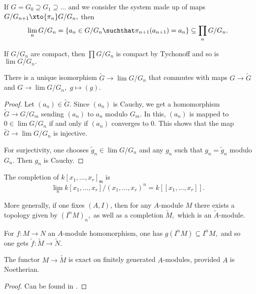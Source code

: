 \begin{prop}
  If \(G = G_0 \supseteq G_1 \supseteq \dotso\) and we consider the system made up of maps
  \(G/{G_{n+1}} \xto{\pi_n} G/{G_n},\) then
  \[\lim_n G/{G_n} = \{a_n \in G/{G_n} \suchthat \pi_{n+1}(a_{n+1}) = a_n\} \subseteq \prod_n G/{G_n}.\]
\end{prop}

\begin{note}
  If \(G/{G_n}\) are compact, then \(\prod G/{G_n}\) is compact by Tychonoff and so is \(\lim G/{G_n}.\)
\end{note}

\begin{prop}
  There is a unique isomorphism \(\tilde{G} \to \lim G/{G_n}\) that commutes with maps \(G \to \tilde{G}\) and \(G \to \lim G/{G_n},\) \(g \mapsto (g).\)
\end{prop}
\begin{proof}
  Let \((a_n) \in \tilde{G}.\) Since \((a_n)\) is Cauchy, we get a homomorphism
  \(\tilde{G} \to G/{G_m}\) sending \((a_n)\) to \(a_n\) modulo \(G_m.\)
  In this, \((a_n)\) is mapped to \(0 \in \lim G/{G_n}\) if and only if \((a_n)\) converges to \(0.\) This shows that the map \(\tilde{G} \to \lim G/{G_n}\) is injective.

  For surjectivity, one chooses \(\tilde{g}_n \in \lim G/{G_n}\) and any \(g_n\) such that \(g_n = \tilde{g}_n\) modulo \(G_n.\) Then \(g_n\) is Cauchy.
\end{proof}

\begin{corollary}
  The completion of \(k[x_1, \dotsc, x_r]_{\mathfrak{m}}\) is
  \[\lim_n k[x_1, \dotsc, x_r]/{(x_1, \dotsc, x_r)^n} = k[[x_1, \dotsc, x_r]].\]
\end{corollary}

More generally, if one fixes \((A, I)\), then for any \(A\)-module \(M\) there exists a topology given by \((I^nM)_n,\) as well as a completion \(\tilde{M},\) which is an \(\tilde{A}\)-module.

For \(f \colon M \to N\) an \(A\)-module homomorphism, one has \(g(I^nM) \subseteq I^nM,\) and so one gets \(\tilde{f} \colon \tilde{M} \to \tilde{N}.\)

\begin{theorem}
  The functor \(M \to \tilde{M}\) is exact on finitely generated \(A\)-modules, provided \(A\) is Noetherian.
\end{theorem}
\begin{proof}
  Can be found in \cite{atiyah1994introduction}.
\end{proof}

